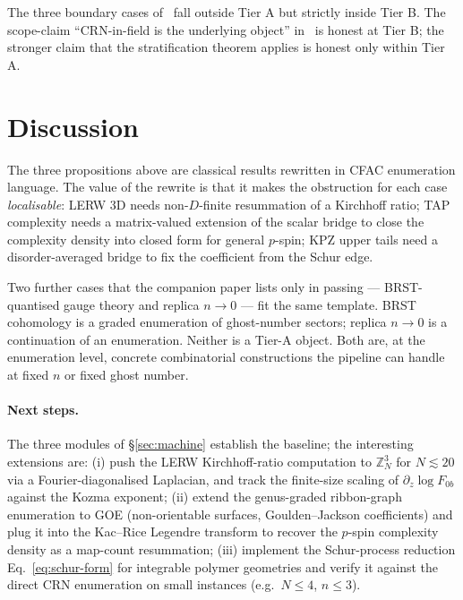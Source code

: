 \documentclass[10pt,a4paper,twocolumn]{article}
\theoremstyle{plain}
\theoremstyle{definition}
\begin{document}
The three boundary cases of~\citep{AmarteifioMannaC3} fall outside
Tier A but strictly inside Tier B.  The scope-claim
``CRN-in-field is the underlying object'' in~\citep[\S8]{AmarteifioMannaC3}
is honest at Tier B; the stronger claim that the stratification
theorem applies is honest only within Tier A.

\section{Discussion}
\label{sec:discussion}

The three propositions above are classical results rewritten in
CFAC enumeration language.  The value of the rewrite is that it
makes the obstruction for each case \emph{localisable}: LERW 3D
needs non-$D$-finite resummation of a Kirchhoff ratio; TAP complexity
needs a matrix-valued extension of the scalar bridge to close the
complexity density into closed form for general $p$-spin;
KPZ upper tails need a disorder-averaged bridge to fix the
coefficient from the Schur edge.

Two further cases that the companion paper lists only in passing ---
BRST-quantised gauge theory and replica $n \to 0$ --- fit the same
template.  BRST cohomology is a graded enumeration of ghost-number
sectors; replica $n \to 0$ is a continuation of an enumeration.
Neither is a Tier-A object.  Both are, at the enumeration level,
concrete combinatorial constructions the pipeline can handle at
fixed $n$ or fixed ghost number.

\paragraph{Next steps.}
The three modules of \S\ref{sec:machine} establish the baseline;
the interesting extensions are:
(i) push the LERW Kirchhoff-ratio computation to
$\mathbb{Z}^3_N$ for $N \lesssim 20$ via a Fourier-diagonalised
Laplacian, and track the finite-size scaling of
$\partial_z \log F_{0b}$ against the Kozma exponent;
(ii) extend the genus-graded ribbon-graph enumeration to GOE
(non-orientable surfaces, Goulden--Jackson coefficients) and
plug it into the Kac--Rice Legendre transform to recover the
$p$-spin complexity density as a map-count resummation;
(iii) implement the Schur-process reduction Eq.~\eqref{eq:schur-form}
for integrable polymer geometries and verify it against the
direct CRN enumeration on small instances
(e.g.\ $N \leq 4$, $n \leq 3$).
\end{document}
